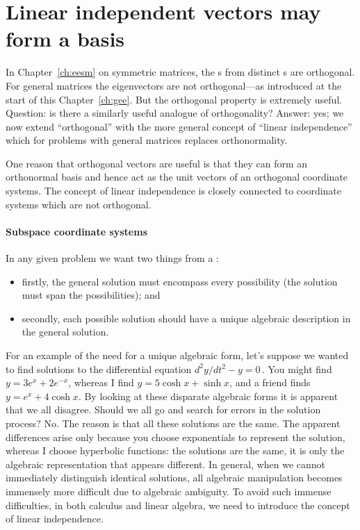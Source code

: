 
\section{Linear independent vectors may form a basis}
\label{sec:lisb}
\secttoc
\begin{comment}
\pooliv{p.92--7,198--208} \holti{\S2.3}
\end{comment}



In Chapter~\ref{ch:eesm} on symmetric matrices, the s from distinct s are orthogonal.  
For general matrices the eigenvectors are not orthogonal---as introduced at the start of this Chapter~\ref{ch:gee}.  
But the orthogonal property is extremely useful.
Question: is there a similarly useful analogue of orthogonality?
Answer: yes; we now extend ``orthogonal'' with the more general concept of ``linear independence'' which for problems with general matrices replaces orthonormality.

One reason that orthogonal vectors are useful is that they can form an orthonormal basis and hence act as the unit vectors of an orthogonal coordinate systems.
The concept of linear independence is closely connected to coordinate systems which are not orthogonal.

\paragraph{Subspace coordinate systems} In any given problem we want two things from a : 
\begin{itemize}
\item firstly, the general solution must encompass every possibility (the solution must span the possibilities); and 
\item secondly, each possible solution should have a unique algebraic description in the general solution.
\end{itemize}
For an example of the need for a unique algebraic form, let's suppose we wanted to find solutions to the differential equation \(d^2y/dt^2-y=0\)\,. 
You might find \(y=3e^x+2e^{-x}\), whereas I find \(y=5\cosh x+\sinh x\), and a friend finds \(y=e^x+4\cosh x\).
By looking at these disparate algebraic forms it is apparent that we all disagree.
Should we all go and search for errors in the solution process?  No.
The reason is that all these solutions are the same.
The apparent differences arise only because you choose exponentials to represent the solution, whereas I choose hyperbolic functions: the solutions are the same, it is only the algebraic representation that appears different. 
In general, when we cannot immediately distinguish identical solutions, all algebraic manipulation becomes immensely more difficult due to algebraic ambiguity.
To avoid such immense difficulties, in both calculus and linear algebra, we need to introduce the concept of linear independence.

